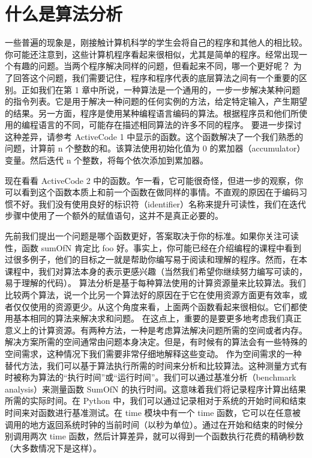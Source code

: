 \section{什么是算法分析}
一些普遍的现象是，刚接触计算机科学的学生会将自己的程序和其他人的相比较。你可能还注意到，这些计算机程序看起来很相似，尤其是简单的程序。经常出现一个有趣的问题。当两个程序解决同样的问题，但看起来不同，哪一个更好呢？
为了回答这个问题，我们需要记住，程序和程序代表的底层算法之间有一个重要的区别。正如我们在第 1 章中所说，一种算法是一个通用的，一步一步解决某种问题的指令列表。它是用于解决一种问题的任何实例的方法，给定特定输入，产生期望的结果。另一方面，程序是使用某种编程语言编码的算法。根据程序员和他们所使用的编程语言的不同，可能存在描述相同算法的许多不同的程序。
要进一步探讨这种差异，请参考 ActiveCode 1 中显示的函数。这个函数解决了一个我们熟悉的问题，计算前 n 个整数的和。该算法使用初始化值为 0 的累加器（accumulator）变量。然后迭代 n 个整数，将每个依次添加到累加器。




现在看看 ActiveCode 2 中的函数。乍一看，它可能很奇怪，但进一步的观察，你可以看到这个函数本质上和前一个函数在做同样的事情。不直观的原因在于编码习惯不好。我们没有使用良好的标识符（identifier）名称来提升可读性，我们在迭代步骤中使用了一个额外的赋值语句，这并不是真正必要的。


先前我们提出一个问题是哪个函数更好，答案取决于你的标准。如果你关注可读性，函数 sumOfN 肯定比 foo 好。事实上，你可能已经在介绍编程的课程中看到过很多例子，他们的目标之一就是帮助你编写易于阅读和理解的程序。然而，在本课程中，我们对算法本身的表示更感兴趣（当然我们希望你继续努力编写可读的，易于理解的代码）。
算法分析是基于每种算法使用的计算资源量来比较算法。我们比较两个算法，说一个比另一个算法好的原因在于它在使用资源方面更有效率，或者仅仅使用的资源更少。从这个角度来看，上面两个函数看起来很相似。它们都使用基本相同的算法来解决求和问题。
在这点上，重要的是要更多地考虑我们真正意义上的计算资源。有两种方法，一种是考虑算法解决问题所需的空间或者内存。解决方案所需的空间通常由问题本身决定。但是，有时候有的算法会有一些特殊的空间需求，这种情况下我们需要非常仔细地解释这些变动。
作为空间需求的一种替代方法，我们可以基于算法执行所需的时间来分析和比较算法。这种测量方式有时被称为算法的“执行时间”或“运行时间”。我们可以通过基准分析（benchmark analysis）来测量函数 SumOfN 的执行时间。这意味着我们将记录程序计算出结果所需的实际时间。在 Python 中，我们可以通过记录相对于系统的开始时间和结束时间来对函数进行基准测试。在 time 模块中有一个 time 函数，它可以在任意被调用的地方返回系统时钟的当前时间（以秒为单位）。通过在开始和结束的时候分别调用两次 time 函数，然后计算差异，就可以得到一个函数执行花费的精确秒数（大多数情况下是这样）。

